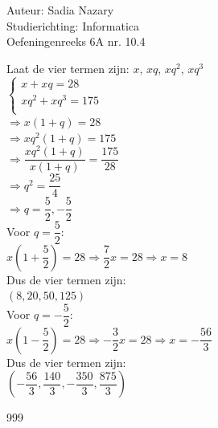 \documentclass[a4paper]{article}
\begin{document}
  
\noindent \large Auteur: Sadia Nazary \\
\noindent \large Studierichting: Informatica\\
\noindent \large Oefeningenreeks 6A nr. 10.4\\

\medskip

\normalsize

Laat de vier termen zijn: $x$, $xq$, $xq^2$, $xq^3$\\

$\left\{
\begin{array}{l}
x+xq = 28\\
xq^2+xq^3 = 175\\
\end{array}
\right.$\\

$\Rightarrow x(1+q)=28$\\

$\Rightarrow xq^2(1+q)=175$\\

$\Rightarrow \dfrac{xq^2(1+q)}{x(1+q)}=\dfrac{175}{28}$\\

$\Rightarrow q^2=\dfrac{25}{4}$\\

$\Rightarrow q=\dfrac{5}{2},-\dfrac{5}{2}$\\

Voor $q = \dfrac{5}{2}$:\\

$x\left(1+\dfrac{5}{2}\right)=28 \Rightarrow \dfrac{7}{2}x=28 \Rightarrow x=8$\\

Dus de vier termen zijn:\\

$(8,20,50,125)$\\

Voor $q = -\dfrac{5}{2}$:\\

$x\left(1-\dfrac{5}{2}\right)=28 \Rightarrow -\dfrac{3}{2}x=28 \Rightarrow x=-\dfrac{56}{3}$\\

Dus de vier termen zijn:\\

$\left(-\dfrac{56}{3},\dfrac{140}{3},-\dfrac{350}{3},\dfrac{875}{3}\right)$\\

\begin{thebibliography}{999}
\end{thebibliography}
\end{document}
